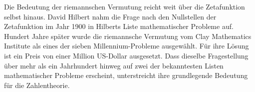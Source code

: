 Die Bedeutung der riemannschen Vermutung reicht weit über die Zetafunktion selbst hinaus. 
David Hilbert nahm die Frage nach den Nullstellen der Zetafunktion im Jahr 1900 in Hilberts Liste mathematischer Probleme auf.
Hundert Jahre später wurde die riemannsche Vermutung vom Clay Mathematics Institute als eines der sieben Millennium-Probleme ausgewählt. 
%
Für ihre Lösung ist ein Preis von einer Million US-Dollar
ausgesetzt. 
Dass dieselbe Fragestellung über mehr als ein Jahrhundert
hinweg auf zwei der bekanntesten Listen mathematischer Probleme erscheint, unterstreicht ihre grundlegende Bedeutung für die Zahlentheorie.


